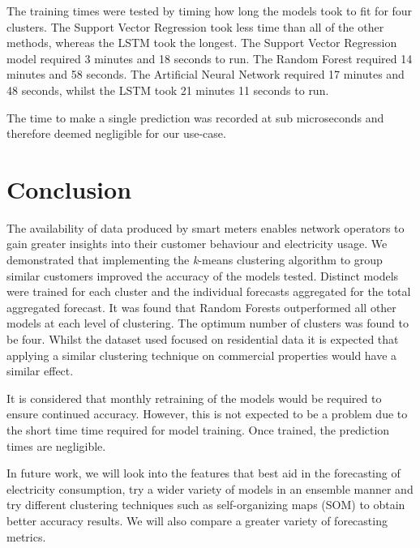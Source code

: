 The training times were tested by timing how long the models took to fit for four clusters. The Support Vector Regression took less time than all of the other methods, whereas the LSTM took the longest. The Support Vector Regression model required 3 minutes and 18 seconds to run. The Random Forest required 14 minutes and 58 seconds. The Artificial Neural Network required 17 minutes and 48 seconds, whilst the LSTM took 21 minutes 11 seconds to run.

The time to make a single prediction was recorded at sub microseconds and therefore deemed negligible for our use-case.

\section{Conclusion}

The availability of data produced by smart meters enables network operators to gain greater insights into their customer behaviour and electricity usage. We demonstrated that implementing the \textit{k}-means clustering algorithm to group similar customers improved the accuracy of the models tested. Distinct models were trained for each cluster and the individual forecasts aggregated for the total aggregated forecast. It was found that Random Forests outperformed all other models at each level of clustering. The optimum number of clusters was found to be four. Whilst the dataset used focused on residential data it is expected that applying a similar clustering technique on commercial properties would have a similar effect.

It is considered that monthly retraining of the models would be required to ensure continued accuracy. However, this is not expected to be a problem due to the short time time required for model training. Once trained, the prediction times are negligible.

In future work, we will look into the features that best aid in the forecasting of electricity consumption, try a wider variety of models in an ensemble manner and try different clustering techniques such as self-organizing maps (SOM) to obtain better accuracy results. We will also compare a greater variety of forecasting metrics.





